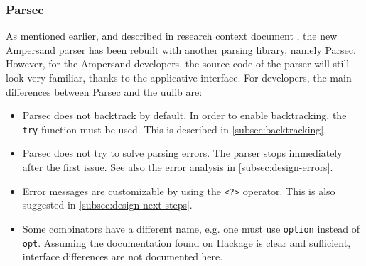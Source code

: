 \subsubsection{Parsec}
\label{subsec:design-parsing-lib}
As mentioned earlier, and described in research context document , the new Ampersand parser has been rebuilt with another parsing library, namely Parsec.
However, for the Ampersand developers, the source code of the parser will still look very familiar, thanks to the applicative interface.
For developers, the main differences between Parsec and the uulib are:
\begin{itemize}
  \item Parsec does not backtrack by default.
    In order to enable backtracking, the \texttt{try} function must be used.
    This is described in \autoref{subsec:backtracking}.
  \item Parsec does not try to solve parsing errors.
    The parser stops immediately after the first issue.
    See also the error analysis in \autoref{subsec:design-errors}.
  \item Error messages are customizable by using the \texttt{<?>} operator.
    This is also suggested in \autoref{subsec:design-next-steps}.
  \item Some combinators have a different name, e.g. one must use \texttt{option} instead of \texttt{opt}.
    Assuming the documentation found on Hackage is clear and sufficient, interface differences are not documented here.
\end{itemize}

